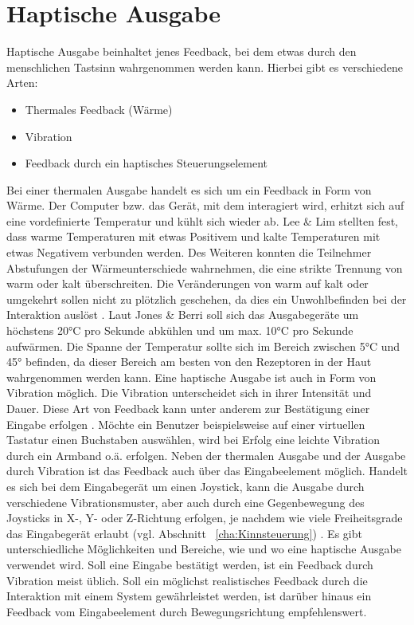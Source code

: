 \section{Haptische Ausgabe}
Haptische Ausgabe beinhaltet jenes Feedback, bei dem etwas durch den menschlichen Tastsinn wahrgenommen werden kann. Hierbei gibt es verschiedene Arten:
%
%
\begin{itemize}
      \item Thermales Feedback (\zB Wärme)
      \item Vibration
			\item Feedback durch ein haptisches Steuerungselement
\end{itemize}
\vspace{\baselineskip}
%
%
Bei einer thermalen Ausgabe handelt es sich um ein Feedback in Form von Wärme. Der Computer bzw. das Gerät, mit dem interagiert wird, erhitzt sich auf eine vordefinierte Temperatur und kühlt sich wieder ab. Lee \& Lim \cite{LeeLim} stellten fest, dass warme Temperaturen mit etwas Positivem und kalte Temperaturen mit etwas Negativem verbunden werden. Des Weiteren konnten die Teilnehmer Abstufungen der Wärmeunterschiede wahrnehmen, die eine strikte Trennung von warm oder kalt überschreiten. Die Veränderungen von warm auf kalt oder umgekehrt sollen nicht zu plötzlich geschehen, da dies ein Unwohlbefinden bei der Interaktion auslöst \cite{LeeLim}. \newline
Laut Jones \& Berri \cite{JonesBerris} soll sich das Ausgabegeräte um höchstens 20°C pro Sekunde abkühlen und um max. 10°C pro Sekunde aufwärmen. Die Spanne der Temperatur sollte sich im Bereich zwischen 5°C und 45° befinden, da dieser Bereich am besten von den Rezeptoren in der Haut wahrgenommen werden kann.
\newline \newline
Eine haptische Ausgabe ist auch in Form von Vibration möglich. Die Vibration unterscheidet sich in ihrer Intensität und Dauer. Diese Art von Feedback kann unter anderem zur Bestätigung einer Eingabe erfolgen \cite{Vibration}. Möchte ein Benutzer beispielsweise auf einer virtuellen Tastatur einen Buchstaben auswählen, wird bei Erfolg eine leichte Vibration durch ein Armband o.ä. erfolgen.
\newline \newline
Neben der thermalen Ausgabe und der Ausgabe durch Vibration ist das Feedback auch über das Eingabeelement möglich. Handelt es sich bei dem Eingabegerät um einen Joystick, kann die Ausgabe durch verschiedene Vibrationsmuster, aber auch durch eine Gegenbewegung des Joysticks in X-, Y- oder Z-Richtung erfolgen, je nachdem wie viele Freiheitsgrade das Eingabegerät erlaubt (vgl. Abschnitt ~\ref{cha:Kinnsteuerung}) \cite{an2002haptic}. 
\newline \newline
Es gibt unterschiedliche Möglichkeiten und Bereiche, wie und wo eine haptische Ausgabe verwendet wird. Soll eine Eingabe bestätigt werden, ist ein Feedback durch Vibration meist üblich. Soll ein möglichst realistisches Feedback durch die Interaktion mit einem System gewährleistet werden, ist darüber hinaus ein Feedback vom Eingabeelement durch Bewegungsrichtung empfehlenswert.  
\newpage
